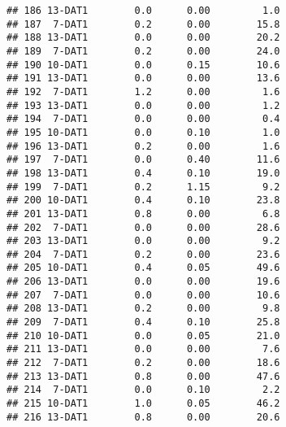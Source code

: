 \documentclass[
]{article}
\begin{document}
\begin{verbatim}
## 186 13-DAT1        0.0      0.00         1.0
## 187  7-DAT1        0.2      0.00        15.8
## 188 13-DAT1        0.0      0.00        20.2
## 189  7-DAT1        0.2      0.00        24.0
## 190 10-DAT1        0.0      0.15        10.6
## 191 13-DAT1        0.0      0.00        13.6
## 192  7-DAT1        1.2      0.00         1.6
## 193 13-DAT1        0.0      0.00         1.2
## 194  7-DAT1        0.0      0.00         0.4
## 195 10-DAT1        0.0      0.10         1.0
## 196 13-DAT1        0.2      0.00         1.6
## 197  7-DAT1        0.0      0.40        11.6
## 198 13-DAT1        0.4      0.10        19.0
## 199  7-DAT1        0.2      1.15         9.2
## 200 10-DAT1        0.4      0.10        23.8
## 201 13-DAT1        0.8      0.00         6.8
## 202  7-DAT1        0.0      0.00        28.6
## 203 13-DAT1        0.0      0.00         9.2
## 204  7-DAT1        0.2      0.00        23.6
## 205 10-DAT1        0.4      0.05        49.6
## 206 13-DAT1        0.0      0.00        19.6
## 207  7-DAT1        0.0      0.00        10.6
## 208 13-DAT1        0.2      0.00         9.8
## 209  7-DAT1        0.4      0.10        25.8
## 210 10-DAT1        0.0      0.05        21.0
## 211 13-DAT1        0.0      0.00         7.6
## 212  7-DAT1        0.2      0.00        18.6
## 213 13-DAT1        0.8      0.00        47.6
## 214  7-DAT1        0.0      0.10         2.2
## 215 10-DAT1        1.0      0.05        46.2
## 216 13-DAT1        0.8      0.00        20.6
\end{verbatim}
\end{document}
